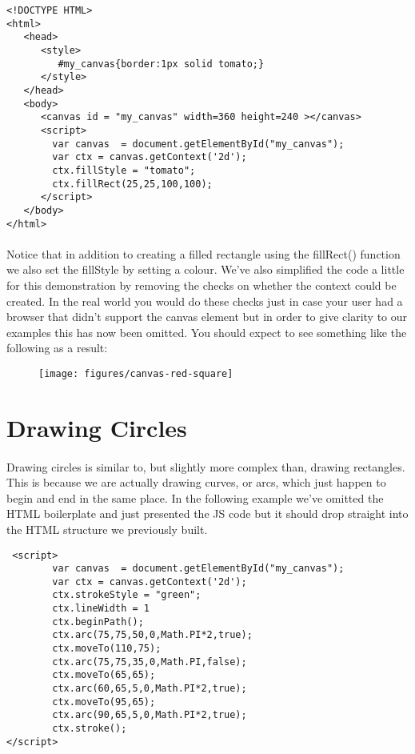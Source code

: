 \begin{lstlisting}
<!DOCTYPE HTML>
<html>
   <head>
      <style>
         #my_canvas{border:1px solid tomato;}
      </style>
   </head>
   <body>
      <canvas id = "my_canvas" width=360 height=240 ></canvas>
      <script>
        var canvas  = document.getElementById("my_canvas");
        var ctx = canvas.getContext('2d');
        ctx.fillStyle = "tomato";
        ctx.fillRect(25,25,100,100);
      </script>
   </body>
</html>
\end{lstlisting}

\paragraph{} Notice that in addition to creating a filled rectangle using the fillRect() function we also set the fillStyle by setting a colour. We've also simplified the code a little for this demonstration by removing the checks on whether the context could be created. In the real world you would do these checks just in case your user had a browser that didn't support the canvas element but in order to give clarity to our examples this has now been omitted. You should expect to see something like the following as a result:

\begin{figure}[H]
\centering
\texttt{[image: figures/canvas-red-square]}
\label{fig:canvas-red-square}
\caption{}
\end{figure}


\section{Drawing Circles}
\paragraph{} Drawing circles is similar to, but slightly more complex than, drawing rectangles. This is because we are actually drawing curves, or arcs, which just happen to begin and end in the same place. In the following example we've omitted the HTML boilerplate and just presented the JS code but it should drop straight into the HTML structure we previously built.

\begin{lstlisting}
 <script>
        var canvas  = document.getElementById("my_canvas");
        var ctx = canvas.getContext('2d');
        ctx.strokeStyle = "green";
        ctx.lineWidth = 1
        ctx.beginPath();
        ctx.arc(75,75,50,0,Math.PI*2,true);  
        ctx.moveTo(110,75);
        ctx.arc(75,75,35,0,Math.PI,false);   
        ctx.moveTo(65,65);
        ctx.arc(60,65,5,0,Math.PI*2,true); 
        ctx.moveTo(95,65);
        ctx.arc(90,65,5,0,Math.PI*2,true);  
        ctx.stroke();
</script>
\end{lstlisting}

